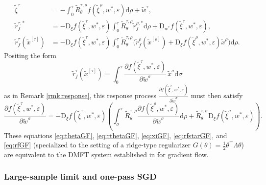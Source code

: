 \documentclass[11pt,letterpaper,reqno]{amsart}
\theoremstyle{definition}
\def\eps{\varepsilon}
\def\d{\mathrm{d}}
\def\D{\mathrm{D}}
\begin{document}
\begin{align}
\tilde\xi^\tau&={-}
\int_0^\tau \tilde R_\theta^{\tau,\rho}
f(\tilde\xi^{\rho},w^*,\eps)\d \rho+\tilde w^\tau,\label{eq:xiGF}\\
\tilde r_f^{\tau,*}&={-}\D_\xi f(\tilde \xi^\tau,w^*,\eps)
\int_0^\tau \tilde R_\theta^{\tau,\rho}\tilde r_f^{\rho,*}\d \rho
+\D_{w^*} f(\tilde \xi^\tau,w^*,\eps),\label{eq:rfstarGF}\\
\tilde r_f^\tau(\tilde x^{[\tau]})
&={-}\D_\xi f(\tilde \xi^\tau,w^*,\eps)
\int_0^\tau \tilde R_\theta^{\tau,\rho}
\Big(\tilde r_f^\rho(\tilde x^{[\rho]})
+\D_\xi f(\tilde \xi^\rho,w^*,\eps)\tilde x^\rho\Big)\d\rho.
\end{align}
Positing the form
\[\tilde r_f^\tau (\tilde x^{[\tau]})
=\int_0^\tau \frac{\partial f(\tilde\xi^\tau,w^*,\eps)}{\partial \tilde w^\sigma}
\,\tilde x^\sigma \d \sigma\]
as in Remark \ref{rmk:response}, this response process 
$\frac{\partial f(\tilde\xi^\tau,w^*,\eps)}{\partial \tilde w^\sigma}$ must then
satisfy
\begin{equation}
\frac{\partial f(\tilde\xi^\tau,w^*,\eps)}{\partial \tilde w^\sigma}
={-}\D_\xi f(\tilde\xi^\tau,w^*,\eps) \left(\int_\sigma^\tau
\tilde R_\theta^{\tau,\rho}\frac{\partial f(\tilde\xi^\rho,w^*,\eps)}{\partial
\tilde w^\sigma} \d \rho +
\tilde R_\theta^{\tau,\sigma}\D_\xi f(\tilde \xi^{\sigma},w^*,\eps)\right).
\label{eq:rfGF}
\end{equation}
These equations \eqref{eq:thetaGF}, \eqref{eq:rthetaGF}, \eqref{eq:xiGF},
\eqref{eq:rfstarGF}, and \eqref{eq:rfGF} (specialized to the setting of a
ridge-type regularizer $G(\theta)=\frac{1}{2}\theta^\top \Lambda \theta$)
are equivalent to the DMFT system established in \cite{celentano2021high}
for gradient flow.

\subsubsection{Large-sample limit and one-pass SGD}\label{sec:comp-onepass}
\end{document}
